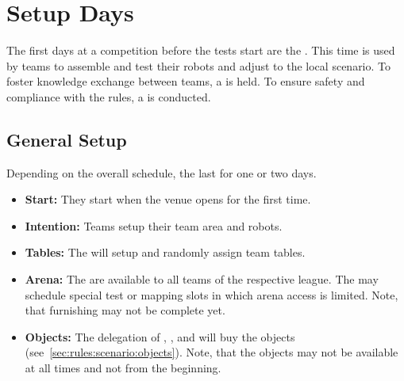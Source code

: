 \chapter{Setup Days}
\label{chap:setupdays}
The first days at a \RoboCup\AtHome{} competition before the tests start are the \SetupDays{}. This time is used by teams to assemble and test their robots and adjust to the local scenario. To foster knowledge exchange between teams, a \PS{} is held. To ensure safety and compliance with the rules, a \RobotInspection{} is conducted.

\section{General Setup}
\label{sec:setupdays:general}
Depending on the overall \RoboCup{} schedule, the \SetupDays{} last for one or two days.

\begin{itemize}
	\item \textbf{Start:} They start when the venue opens for the first time.
	\item \textbf{Intention:} Teams setup their team area and robots.
	\item \textbf{Tables:} The  will setup and randomly assign team tables.
	\item \textbf{Arena:} The \Arenas{} are available to all teams of the respective league. The  may schedule special test or mapping slots in which arena access is limited. Note, that furnishing may not be complete yet.
	\item \textbf{Objects:} The delegation of , ,  and  will buy the objects (see~\ref{sec:rules:scenario:objects}). Note, that the objects may not be available at all times and not from the beginning.
\end{itemize}

